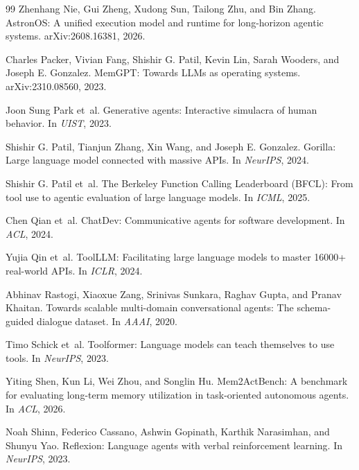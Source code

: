 \documentclass[11pt]{article}
\begin{document}
\begin{thebibliography}{99}
Zhenhang Nie, Gui Zheng, Xudong Sun, Tailong Zhu, and Bin Zhang.
\newblock AstronOS: A unified execution model and runtime for long-horizon agentic systems.
\newblock arXiv:2608.16381, 2026.

Charles Packer, Vivian Fang, Shishir G. Patil, Kevin Lin, Sarah Wooders, and Joseph E. Gonzalez.
\newblock MemGPT: Towards LLMs as operating systems.
\newblock arXiv:2310.08560, 2023.

Joon Sung Park et~al.
\newblock Generative agents: Interactive simulacra of human behavior.
\newblock In \emph{UIST}, 2023.

Shishir G. Patil, Tianjun Zhang, Xin Wang, and Joseph E. Gonzalez.
\newblock Gorilla: Large language model connected with massive APIs.
\newblock In \emph{NeurIPS}, 2024.

Shishir G. Patil et~al.
\newblock The Berkeley Function Calling Leaderboard (BFCL): From tool use to agentic evaluation of large language models.
\newblock In \emph{ICML}, 2025.

Chen Qian et~al.
\newblock ChatDev: Communicative agents for software development.
\newblock In \emph{ACL}, 2024.

Yujia Qin et~al.
\newblock ToolLLM: Facilitating large language models to master 16000+ real-world APIs.
\newblock In \emph{ICLR}, 2024.

Abhinav Rastogi, Xiaoxue Zang, Srinivas Sunkara, Raghav Gupta, and Pranav Khaitan.
\newblock Towards scalable multi-domain conversational agents: The schema-guided dialogue dataset.
\newblock In \emph{AAAI}, 2020.

Timo Schick et~al.
\newblock Toolformer: Language models can teach themselves to use tools.
\newblock In \emph{NeurIPS}, 2023.

Yiting Shen, Kun Li, Wei Zhou, and Songlin Hu.
\newblock Mem2ActBench: A benchmark for evaluating long-term memory utilization in task-oriented autonomous agents.
\newblock In \emph{ACL}, 2026.

Noah Shinn, Federico Cassano, Ashwin Gopinath, Karthik Narasimhan, and Shunyu Yao.
\newblock Reflexion: Language agents with verbal reinforcement learning.
\newblock In \emph{NeurIPS}, 2023.


\end{thebibliography}
\end{document}

